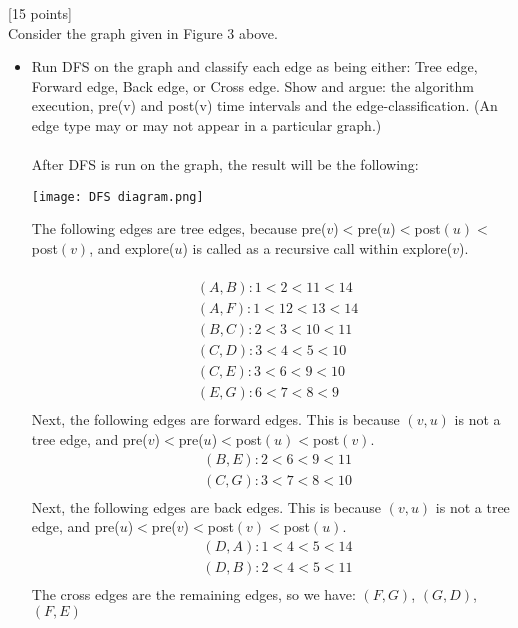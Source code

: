 \documentclass[12pt]{article}
\newcounter{ques}
\newenvironment{question}{\stepcounter{ques}{\noindent\bf Question \arabic{ques}:}}{\vspace{5mm}}
\begin{document}
\newpage


\begin{question}[15 points]\\
Consider the graph given in Figure 3 above.
\begin{itemize}
	\item Run DFS on the graph and classify each edge as being either: Tree edge, Forward edge, Back edge, or Cross edge. Show and argue: the algorithm execution,   pre(v) and post(v) time intervals and the edge-classification. (An edge type may or may not appear in a particular graph.)\\\\
  After DFS is run on the graph, the result will be the following:\\
  \begin{center}
    \texttt{[image: DFS diagram.png]}
  \end{center}
  The following edges are tree edges, because pre($v$)$<$pre($u$)$<$post$(u)<$post$(v)$, and explore($u$) is called as a recursive call within explore($v$).\\\\
  \begin{align*}
    &(A,B):  1 < 2 < 11 < 14\\
    &(A,F):  1 < 12 < 13 < 14\\
    &(B,C):  2 < 3 < 10 < 11\\
    &(C,D):  3 < 4 < 5 < 10\\
    &(C,E):  3 < 6 < 9 < 10\\
    &(E,G):  6 < 7 < 8 < 9\\
  \end{align*}
  Next, the following edges are forward edges. This is because $(v,u)$ is not a tree edge, and pre($v$)$<$pre($u$)$<$post$(u)<$post$(v)$.
  \begin{align*}
    &(B,E):  2 < 6 < 9 < 11\\
    &(C,G):  3 < 7 < 8 < 10\\
  \end{align*}
  Next, the following edges are back edges. This is because $(v,u)$ is not a tree edge, and pre($u$)$<$pre($v$)$<$post$(v)<$post$(u)$.
  \begin{align*}
    &(D,A):  1 < 4 < 5 < 14\\
    &(D,B):  2 < 4 < 5 < 11\\
  \end{align*}
  The cross edges are the remaining edges, so we have:
  $(F,G)$, $(G,D)$, $(F,E)$


\end{itemize}
\end{question}
\end{document}
